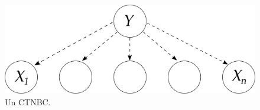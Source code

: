 


\begin{figure}
\centering
\includegraphics[width=0.9\columnwidth]{immagini/ctnb}
\caption[Un \acs{CTNBC}]{Un \acf{CTNBC}.}
\label{fig:ctnb}
\end{figure}

